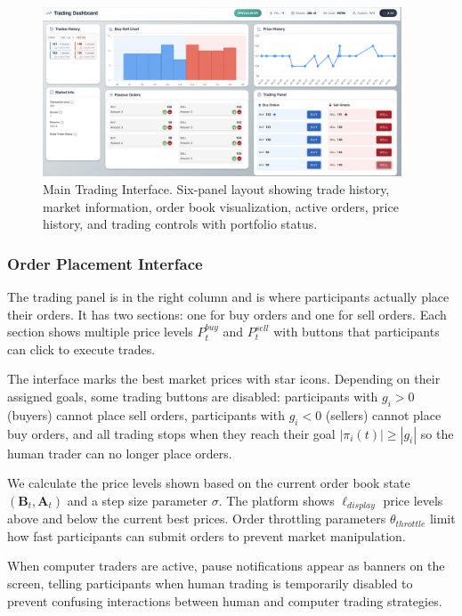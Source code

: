 \begin{figure}[!htbp]
\centering
\includegraphics[width=0.95\textwidth]{figs/trading-dashboard.png}
\caption{Main Trading Interface. Six-panel layout showing trade history, market information, order book visualization, active orders, price history, and trading controls with portfolio status.}
\label{fig:dashboard}
\end{figure}

\subsubsection{Order Placement Interface}

The trading panel is in the right column and is where participants actually place their orders. It has two sections: one for buy orders and one for sell orders. Each section shows multiple price levels $P_t^{buy}$ and $P_t^{sell}$ with buttons that participants can click to execute trades.

The interface marks the best market prices with star icons. Depending on their assigned goals, some trading buttons are disabled: participants with $g_i > 0$ (buyers) cannot place sell orders, participants with $g_i < 0$ (sellers) cannot place buy orders, and all trading stops when they reach their goal $|\pi_i(t)| \geq |g_i|$ so the human trader can no longer place orders.

We calculate the price levels shown based on the current order book state $(\mathbf{B}_t, \mathbf{A}_t)$ and a step size parameter $\sigma$. The platform shows $\ell_{display}$ price levels above and below the current best prices. Order throttling parameters $\theta_{throttle}$ limit how fast participants can submit orders to prevent market manipulation.

When computer traders are active, pause notifications appear as banners on the screen, telling participants when human trading is temporarily disabled to prevent confusing interactions between human and computer trading strategies.

